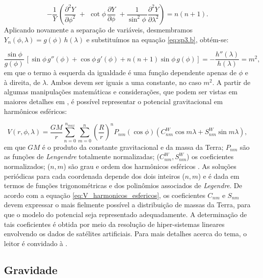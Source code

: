\begin{equation}
\label{eq:sp3.b}
\displaystyle{ -{\frac{1}{Y}\,}\left({\frac{\partial^{2}Y}{\partial \phi^{2}}}\,\, + \,\, {\cot \phi\,}{\frac{\partial Y}{\partial \phi}}\,\, + {\frac{1}{\sin^{2}\phi \,}}{\frac{\partial^{2}Y}{\partial \lambda^{2}}}\right) = n(n+1)}.
\end{equation} Aplicando novamente a separação de variáveis, desmembramos $Y_{n}(\phi,\lambda) = g(\phi)\,h(\lambda)$ e substituímos na equação \ref{eq:sp3.b}, obtém-se:

\begin{equation}
\label{eq:harmonicos_sep}
{\frac{\sin \phi}{g(\phi)}\,\left[ {\sin\phi \,g''(\phi)} + {\cos\phi\,g'(\phi)} + {n(n+1)\sin\phi\,g(\phi)}\right] = - \frac{h''(\lambda)}{h(\lambda)} = m^{2}},
\end{equation} em que o termo à esquerda da igualdade é uma função dependente apenas de $\phi$ e à direita, de $\lambda$. Ambos devem ser iguais a uma constante, no caso  $m^{2}$.
A partir de algumas manipulações matemáticas e considerações, que podem ser vistas em maiores detalhes em , é possível representar o potencial gravitacional em harmônicos esféricos:

\begin{equation}
\label{eq:V_harmonicos_esfericos}
\displaystyle {V(r,\phi, \lambda)  =\frac{GM}{r} \sum_{n=0}^{n_{max}} \sum_{m=0}^{n} \left( \frac{R}{r}\right)^{n} P_{nm}(\cos\phi)(C_{nm}^{W} \cos m\lambda + S_{nm}^{W} \sin m\lambda)},
\end{equation} em que $GM$ é o produto da constante gravitacional e da massa da Terra; $P_{nm}$ são as funções de \textit{Lengendre} totalmente normalizadas; ($C_{nm}^{W}, S_{nm}^{W}$) os coeficientes normalizados; ($n,m$) são grau e ordem dos harmônicos esféricos \cite{jekeli2000,barthelmes2009}. As soluções periódicas para cada coordenada depende dos dois inteiros ($n,m$) e é dada em termos de funções trigonométricas e dos polinômios associados de \textit{Legendre}. De acordo com a equação \ref{eq:V_harmonicos_esfericos}, os coeficientes $C_{nm}$ e $S_{nm}$ devem expressar o mais fielmente possível a distribuição de massas da Terra, para que o modelo do potencial seja representado adequadamente. A determinação de tais coeficientes é obtida por meio da resolução de hiper-sistemas lineares envolvendo os dados de satélites artificiais. Para mais detalhes acerca do tema, o leitor é convidado à \cite{heiskanen1967, torge2001geodesy,hofmann2006}.

\subsection{Gravidade}

